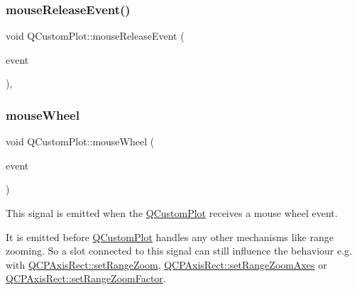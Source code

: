 \subsubsection{\texorpdfstring{mouseReleaseEvent()}{mouseReleaseEvent()}}
{\footnotesize\ttfamily void Q\+Custom\+Plot\+::mouse\+Release\+Event (\begin{DoxyParamCaption}\item[{Q\+Mouse\+Event $\ast$}]{event }\end{DoxyParamCaption})\hspace{0.3cm}{\ttfamily [protected]}, {\ttfamily [virtual]}}

\mbox{\label{class_q_custom_plot_ac80a14206f99304a91d2aa55775ec3ff}} 
\subsubsection{\texorpdfstring{mouseWheel}{mouseWheel}}
{\footnotesize\ttfamily void Q\+Custom\+Plot\+::mouse\+Wheel (\begin{DoxyParamCaption}\item[{Q\+Wheel\+Event $\ast$}]{event }\end{DoxyParamCaption})\hspace{0.3cm}{\ttfamily [signal]}}

This signal is emitted when the \mbox{\hyperlink{class_q_custom_plot}{Q\+Custom\+Plot}} receives a mouse wheel event.

It is emitted before \mbox{\hyperlink{class_q_custom_plot}{Q\+Custom\+Plot}} handles any other mechanisms like range zooming. So a slot connected to this signal can still influence the behaviour e.\+g. with \mbox{\hyperlink{class_q_c_p_axis_rect_a7960a9d222f1c31d558b064b60f86a31}{Q\+C\+P\+Axis\+Rect\+::set\+Range\+Zoom}}, \mbox{\hyperlink{class_q_c_p_axis_rect_a9442cca2aa358405f39a64d51eca13d2}{Q\+C\+P\+Axis\+Rect\+::set\+Range\+Zoom\+Axes}} or \mbox{\hyperlink{class_q_c_p_axis_rect_a895d7ac745ea614e04056244b3c138ac}{Q\+C\+P\+Axis\+Rect\+::set\+Range\+Zoom\+Factor}}. \mbox{\label{class_q_custom_plot_ae896140beff19424e9e9e02d6e331104}} 
